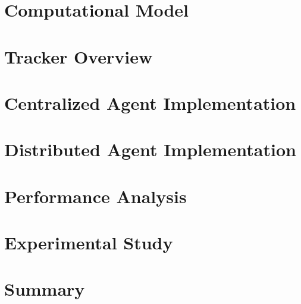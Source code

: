 \section{Computational Model}

\section{Tracker Overview}

\section{Centralized Agent Implementation}

\section{Distributed Agent Implementation}

\section{Performance Analysis}

\section{Experimental Study}

\section{Summary}